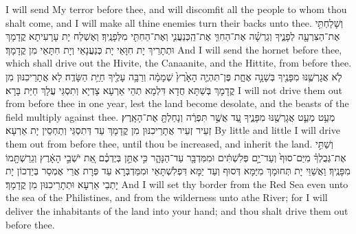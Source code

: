 {{I will send My terror before thee, and will discomfit all the people to whom thou shalt come, and I will make all thine enemies turn their backs unto thee.}{}
{וְשָׁלַחְתִּ֥י אֶת־הַצִּרְעָ֖ה לְפָנֶ֑יךָ וְגֵרְשָׁ֗ה אֶת־הַחִוִּ֧י אֶת־הַֽכְּנַעֲנִ֛י וְאֶת־הַחִתִּ֖י מִלְּפָנֶֽיךָ׃
}
{וְאֶשְׁלַח יָת עָרָעִיתָא קֳדָמָךְ וּתְתָרֵיךְ יָת חִוָּאֵי יָת כְּנַעֲנָאֵי וְיָת חִתָּאֵי מִן קֳדָמָךְ׃}
{And I will send the hornet before thee, which shall drive out the Hivite, the Canaanite, and the Hittite, from before thee.}{}
{לֹ֧א אֲגָרְשֶׁ֛נּוּ מִפָּנֶ֖יךָ בְּשָׁנָ֣ה אֶחָ֑ת פֶּן־תִּהְיֶ֤ה הָאָ֙רֶץ֙ שְׁמָמָ֔ה וְרַבָּ֥ה עָלֶ֖יךָ חַיַּ֥ת הַשָּׂדֶֽה׃
}
{לָא אֲתָרֵיכִנּוּן מִן קֳדָמָךְ בְּשַׁתָּא חֲדָא דִּלְמָא תְהֵי אַרְעָא צָדְיָא וְתִסְגֵּי עֲלָךְ חַיַּת בָּרָא׃}
{I will not drive them out from before thee in one year, lest the land become desolate, and the beasts of the field multiply against thee.}{}
{מְעַ֥ט מְעַ֛ט אֲגָרְשֶׁ֖נּוּ מִפָּנֶ֑יךָ עַ֚ד אֲשֶׁ֣ר תִּפְרֶ֔ה וְנָחַלְתָּ֖ אֶת־הָאָֽרֶץ׃
}
{זְעֵיר זְעֵיר אֲתָרֵיכִנּוּן מִן קֳדָמָךְ עַד דְּתִסְגֵּי וְתַחְסֵין יָת אַרְעָא׃}
{By little and little I will drive them out from before thee, until thou be increased, and inherit the land.}{}
{וְשַׁתִּ֣י אֶת־גְּבֻלְךָ֗ מִיַּם־סוּף֙ וְעַד־יָ֣ם פְּלִשְׁתִּ֔ים וּמִמִּדְבָּ֖ר עַד־הַנָּהָ֑ר כִּ֣י \legarmeh  אֶתֵּ֣ן בְּיֶדְכֶ֗ם אֵ֚ת יֹשְׁבֵ֣י הָאָ֔רֶץ וְגֵרַשְׁתָּ֖מוֹ מִפָּנֶֽיךָ׃
}
{וַאֲשַׁוֵּי יָת תְּחוּמָךְ מִיַּמָּא דְּסוּף וְעַד יַמָּא דִּפְלִשְׁתָּאֵי וּמִמַּדְבְּרָא עַד פְּרָת אֲרֵי אֶמְסַר בְּיַדְכוֹן יָת יָתְבֵי אַרְעָא וּתְתָרֵיכִנּוּן מִן קֳדָמָךְ׃}
{And I will set thy border from the Red Sea even unto the sea of the Philistines, and from the wilderness unto athe River; for I will deliver the inhabitants of the land into your hand; and thou shalt drive them out before thee.}{}
}
